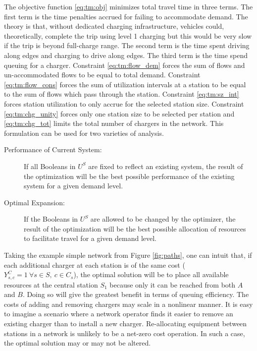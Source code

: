 The objective function \eqref{eq:tm:obj} minimizes total travel time in three terms. The first term is the time penalties accrued for failing to accommodate demand. The theory is that, without dedicated charging infrastructure, vehicles could, theoretically, complete the trip using level 1 charging but this would be very slow if the trip is beyond full-charge range. The second term is the time spent driving along edges and charging to drive along edges. The third term is the time spend queuing for a charger. Constraint \eqref{eq:tm:flow_dem} forces the sum of flows and un-accommodated flows to be equal to total demand. Constraint \eqref{eq:tm:flow_cons} forces the sum of utilization intervals at a station to be equal to the sum of flows which pass through the station. Constraint \eqref{eq:tm:sz_int} forces station utilization to only accrue for the selected station size. Constraint \eqref{eq:tm:chg_unity} forces only one station size to be selected per station and \eqref{eq:tm:chg_tot} limits the total number of chargers in the network. This formulation can be used for two varieties of analysis.

\begin{description}
	\item [Performance of Current System:] If all Booleans in $U^S$ are fixed to reflect an existing system, the result of the optimization will be the best possible performance of the existing system for a given demand level.
	\item [Optimal Expansion:] If the Booleans in $U^S$ are allowed to be changed by the optimizer, the result of the optimization will be the best possible allocation of resources to facilitate travel for a given demand level.
\end{description}

Taking the example simple network from Figure \ref{fig:paths}, one can intuit that, if each additional charger at each station is of the same cost ($Y^C_{s, c} = 1\ \forall s\in S,\ c\in C_s$), the optimal solution will be to place all available resources at the central station $S_1$ because only it can be reached from both $A$ and $B$. Doing so will give the greatest benefit in terms of queuing efficiency. The costs of adding and removing chargers may scale in a nonlinear manner. It is easy to imagine a scenario where a network operator finds it easier to remove an existing charger than to install a new charger. Re-allocating equipment between stations in a network is unlikely to be a net-zero cost operation. In such a case, the optimal solution may or may not be altered.